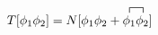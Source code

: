 \documentclass[margin=3pt]{standalone}
\begin{document}
\fontsize{14}{16}
$\displaystyle
T[\phi_1 \phi_2]
= N[ 
    \phi_1 \phi_2
    + \contraction[1ex]{}{\phi_1}{}{\phi_2}
    \phi_1 \phi_2
]
$
    
\end{document}
